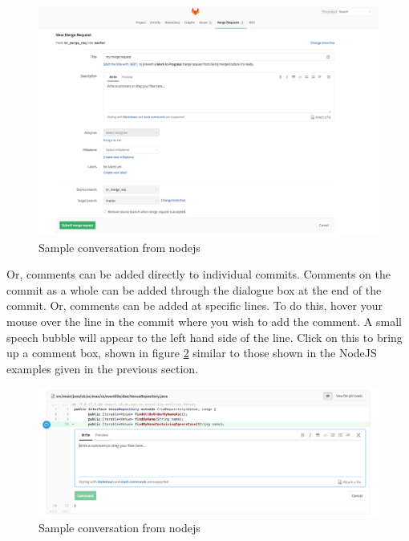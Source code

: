 \documentclass[
]{book}
\begin{document}
\begin{figure}

{\centering \includegraphics[width=1\linewidth]{images/merge_request_assignee} 

}

\caption{Sample conversation from nodejs}\label{fig:merge-request-assignee-fig}
\end{figure}

Or, comments can be added directly to individual commits. Comments on the commit as a whole can be added through the dialogue box at the end of the commit. Or, comments can be added at specific lines. To do this, hover your mouse over the line in the commit where you wish to add the comment. A small speech bubble will appear to the left hand side of the line. Click on this to bring up a comment box, shown in figure \ref{fig:comment-commit-fig} similar to those shown in the NodeJS examples given in the previous section.

\begin{figure}

{\centering \includegraphics[width=1\linewidth]{images/comment_commit} 

}

\caption{Sample conversation from nodejs}\label{fig:comment-commit-fig}
\end{figure}
\end{document}
